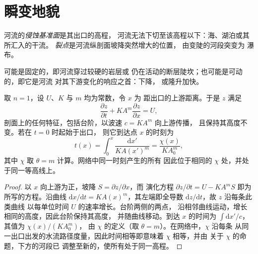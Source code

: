 \section{瞬变地貌}\label{sec:b3:quantitative-geomorphology:transient}

\begin{definition}[侵蚀基准面与裂点]\label{def:b3:quantitative-geomorphology:knickpoint}
河流的\emph{侵蚀基准面}是其出口的高程，
河流无法下切至该高程以下：海、湖泊或其所汇入的干流。
\emph{裂点}是河流纵剖面坡降突然增大的位置，
由变陡的河段突变为
瀑布。
\end{definition}

可能是固定的，即河流穿过较硬的岩层或
仍在活动的断层陡坎；也可能是可动的，即它是河流
对其下游变化的响应之首：下降，
或隆升加快。

\begin{theorem}[作为运动学波的裂点]\label{thm:b3:quantitative-geomorphology:kinematic}
取 $n = 1$，设 $U$、$K$ 与 $m$ 均为常数，令 $x$ 为
距出口的上游距离。于是 $z$ 满足
\[
\frac{\partial z}{\partial t} + K A^m \frac{\partial z}{\partial x} = U ,
\]
剖面上的任何特征，包括台阶，以波速 $c = K A^m$ 向上游传播，
且保持其高度不变。若在 $t = 0$ 时起始于出口，
则它到达点 $x$ 的时刻为
\[
t(x) = \int_0^x \frac{\mathrm{d}x'}{K A(x')^m} = \frac{\chi(x)}{K A_0^m},
\]
其中 $\chi$ 取 $\theta = m$ 计算。网络中同一时刻产生的所有
因此位于相同的 $\chi$ 处，并处于同一等高线上。
\end{theorem}

\begin{proof}
以 $x$ 向上游为正，坡降 $S = \partial z/\partial x$，而
演化方程 $\partial z/\partial t = U - K A^m S$ 即为所写的方程。沿曲线
$\mathrm{d}x/\mathrm{d}t = K A(x)^m$，其左端即全导数
$\mathrm{d}z/\mathrm{d}t$，故 $z$ 沿每条此类曲线
以每单位时间 $U$ 的速率增长。台阶两侧的两点，
沿相邻曲线运动，增长相同的高度，因此台阶保持其高度，
并随曲线移动。到达 $x$ 的时间为
$\int \mathrm{d}x'/c$，其值为 $\chi(x)/(K A_0^m)$，
由 $\chi$ 的定义（取 $\theta = m$）。在网络中，$\chi$ 沿每条
从同一出口出发的水流路径度量，因此时间相等即意味着 $\chi$ 相等，并由
关于 $\chi$ 的命题，下方的河段已
调整至新的，使所有处于同一高程。
\end{proof}

